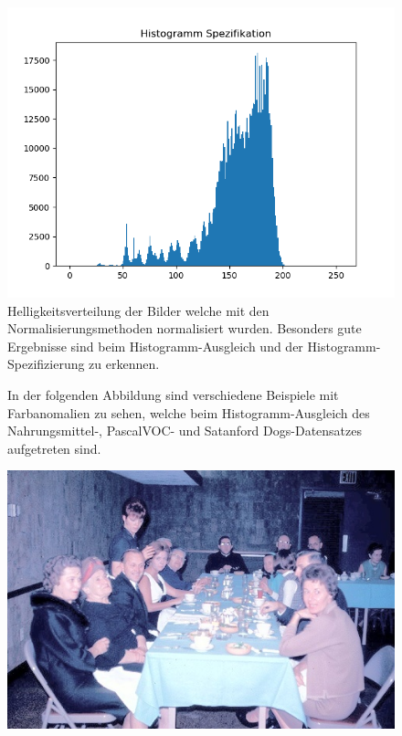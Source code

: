\begin{appendices}
\begin{figure}[htbp]
\begin{minipage}{0.49\textwidth}
\end{minipage}
\begin{minipage}{0.49\textwidth}
\includegraphics[width=\textwidth]{Sources/Anhang/resize_0250_HS.png}
\end{minipage}
\caption{Helligkeitsverteilung der Bilder welche mit den Normalisierungsmethoden normalisiert wurden. Besonders gute Ergebnisse sind beim Histogramm-Ausgleich und der Histogramm-Spezifizierung zu erkennen.}
\label{img:hellver}
\end{figure}
\begin{figure}[htb]
\center
\begin{minipage}{\textwidth}
In der folgenden Abbildung sind verschiedene Beispiele mit Farbanomalien zu sehen, welche beim Histogramm-Ausgleich des Nahrungsmittel-, PascalVOC- und Satanford Dogs-Datensatzes aufgetreten sind.
\end{minipage}
\begin{minipage}{\textwidth}
\hspace{\textwidth}
\end{minipage}
\begin{minipage}{0.19\textwidth}
\includegraphics[width=\textwidth]{images/anomalien/HA/000613.jpg}

\end{minipage}
\end{figure}
\end{appendices}
